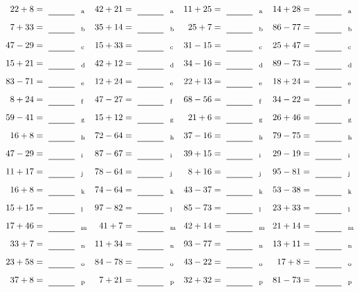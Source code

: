 \documentclass
[
  draft    = true,
  fontsize = 11pt,
  parskip  = half-
]
{scrartcl}
\begin{document}
\clearpage
\begin{align*}
    \pline{22+8}&=\rline{a}
  & \pline{42+21}&=\rline{a}
  & \pline{11+25}&=\rline{a}
  & \pline{14+28}&=\rline{a} \\[1ex]
    \pline{7+33}&=\rline{b}
  & \pline{35+14}&=\rline{b}
  & \pline{25+7}&=\rline{b}
  & \pline{86-77}&=\rline{b} \\[1ex]
    \pline{47-29}&=\rline{c}
  & \pline{15+33}&=\rline{c}
  & \pline{31-15}&=\rline{c}
  & \pline{25+47}&=\rline{c} \\[1ex]
    \pline{15+21}&=\rline{d}
  & \pline{42+12}&=\rline{d}
  & \pline{34-16}&=\rline{d}
  & \pline{89-73}&=\rline{d} \\[1ex]
    \pline{83-71}&=\rline{e}
  & \pline{12+24}&=\rline{e}
  & \pline{22+13}&=\rline{e}
  & \pline{18+24}&=\rline{e} \\[1ex]
    \pline{8+24}&=\rline{f}
  & \pline{47-27}&=\rline{f}
  & \pline{68-56}&=\rline{f}
  & \pline{34-22}&=\rline{f} \\[1ex]
    \pline{59-41}&=\rline{g}
  & \pline{15+12}&=\rline{g}
  & \pline{21+6}&=\rline{g}
  & \pline{26+46}&=\rline{g} \\[1ex]
    \pline{16+8}&=\rline{h}
  & \pline{72-64}&=\rline{h}
  & \pline{37-16}&=\rline{h}
  & \pline{79-75}&=\rline{h} \\[1ex]
    \pline{47-29}&=\rline{i}
  & \pline{87-67}&=\rline{i}
  & \pline{39+15}&=\rline{i}
  & \pline{29-19}&=\rline{i} \\[1ex]
    \pline{11+17}&=\rline{j}
  & \pline{78-64}&=\rline{j}
  & \pline{8+16}&=\rline{j}
  & \pline{95-81}&=\rline{j} \\[1ex]
    \pline{16+8}&=\rline{k}
  & \pline{74-64}&=\rline{k}
  & \pline{43-37}&=\rline{k}
  & \pline{53-38}&=\rline{k} \\[1ex]
    \pline{15+15}&=\rline{l}
  & \pline{97-82}&=\rline{l}
  & \pline{85-73}&=\rline{l}
  & \pline{23+33}&=\rline{l} \\[1ex]
    \pline{17+46}&=\rline{m}
  & \pline{41+7}&=\rline{m}
  & \pline{42+14}&=\rline{m}
  & \pline{21+14}&=\rline{m} \\[1ex]
    \pline{33+7}&=\rline{n}
  & \pline{11+34}&=\rline{n}
  & \pline{93-77}&=\rline{n}
  & \pline{13+11}&=\rline{n} \\[1ex]
    \pline{23+58}&=\rline{o}
  & \pline{84-78}&=\rline{o}
  & \pline{43-22}&=\rline{o}
  & \pline{17+8}&=\rline{o} \\[1ex]
    \pline{37+8}&=\rline{p}
  & \pline{7+21}&=\rline{p}
  & \pline{32+32}&=\rline{p}
  & \pline{81-73}&=\rline{p}
\end{align*}
\end{document}
